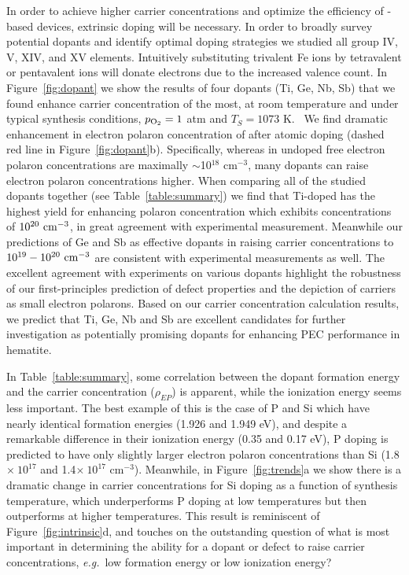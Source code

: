  In order to achieve higher carrier concentrations and optimize the efficiency of -based devices, extrinsic doping will be necessary.
 In order to broadly survey potential dopants and identify optimal doping strategies we studied all group IV, V, XIV, and XV elements. Intuitively substituting trivalent Fe ions by tetravalent or pentavalent ions will donate electrons due to the increased valence count.
 In Figure~\ref{fig:dopant} we show the results of four dopants (Ti, Ge, Nb, Sb) that we found enhance carrier concentration of  the most, at room temperature and under typical synthesis conditions, $p_{\rm O_2}=1$ atm and $T_S=1073$ K.~\cite{tian2020electronic}
 We find dramatic enhancement in electron polaron concentration of  after atomic doping (dashed red line in Figure~\ref{fig:dopant}b).
 Specifically, whereas in undoped  free electron polaron concentrations are maximally $\sim$10$^{18}$ cm$^{-3}$, many dopants can raise electron polaron concentrations higher.
 When comparing all of the studied dopants together (see Table~\ref{table:summary}) we find that Ti-doped  has the highest yield for enhancing polaron concentration which exhibits concentrations of $\rm 10^{20}\ cm^{-3}$, in great agreement with experimental measurement. \cite{hahn2010photoelectrochemical,glasscock2007enhancement,rioult2014single,fu2014highly,malviya2017influence}
 Meanwhile our predictions of Ge and Sb as effective dopants in raising carrier concentrations to $\rm 10^{19}-10^{20}\ cm^{-3}$ are consistent with experimental measurements as well.\cite{annamalai2018influence,liu2014highly}
 The excellent agreement with experiments on various dopants highlight the robustness of our first-principles prediction of defect properties and the depiction of carriers as small electron polarons.
 Based on our carrier concentration calculation results, we predict that Ti, Ge, Nb and Sb are excellent candidates for further investigation as potentially promising dopants for enhancing PEC performance in hematite.


 In Table~\ref{table:summary}, some correlation between the dopant formation energy and the carrier concentration ($\rho_{EP}$) is apparent, while the ionization energy seems less important.
 The best example of this is the case of P and Si which have nearly identical formation energies (1.926 and 1.949 eV), and despite a remarkable difference in their ionization energy (0.35 and 0.17 eV), P doping is predicted to have only slightly larger electron polaron concentrations than Si (1.8$\times\ 10^{17}$ and 1.4$\times\ 10^{17}$ cm$^{-3}$).
 Meanwhile, in Figure~\ref{fig:trends}a we show there is a dramatic change in carrier concentrations for Si doping as a function of synthesis temperature, which underperforms P doping at low temperatures but then outperforms at higher temperatures.
 This result is reminiscent of Figure~\ref{fig:intrinsic}d, and touches on the outstanding question of what is most important in determining the ability for a dopant or defect to raise carrier concentrations, \textit{e.g.}\ low formation energy or low ionization energy?

